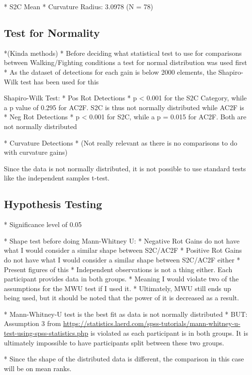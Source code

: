 * S2C Mean
   * Curvature Radius: 3.0978 (N = 78)



\subsection{Test for Normality}
*(Kinda methods)
   * Before deciding what statistical test to use for comparisons between Walking/Fighting conditions a test for normal distribution was used first
   * As the dataset of detections for each gain is below 2000 elements, the Shapiro-Wilk test has been used for this

Shapiro-Wilk Test:
   * Pos Rot Detections
      * p < 0.001 for the S2C Category, while a p value of 0.295 for AC2F. S2C is thus not normally distributed while AC2F is
   * Neg Rot Detections
      * p < 0.001 for S2C, while a p = 0.015 for AC2F. Both are not normally distributed
      
   * Curvature Detections
      * (Not really relevant as there is no comparisons to do with curvature gains)

Since the data is not normally distributed, it is not possible to use standard tests like the independent samples t-test.
   
\subsection{Hypothesis Testing}
* Significance level of 0.05

* Shape test before doing Mann-Whitney U:
   * Negative Rot Gains do not have what I would consider a similar shape between S2C/AC2F
   * Positive Rot Gains do not have what I would consider a similar shape between S2C/AC2F either
   * Present figures of this
* Independent observations is not a thing either. Each participant provides data in both groups. 
* Meaning I would violate two of the assumptions for the MWU test if I used it.
* Ultimately, MWU still ends up being used, but it should be noted that the power of it is decreased as a result. 

* Mann-Whitney-U test is the best fit as data is not normally distributed
   * BUT: Assumption 3 from \url{https://statistics.laerd.com/spss-tutorials/mann-whitney-u-test-using-spss-statistics.php} is violated as each participant is in both groups. It is ultimately impossible to have participants split between these two groups. 

* Since the shape of the distributed data is different, the comparison in this case will be on mean ranks. 

